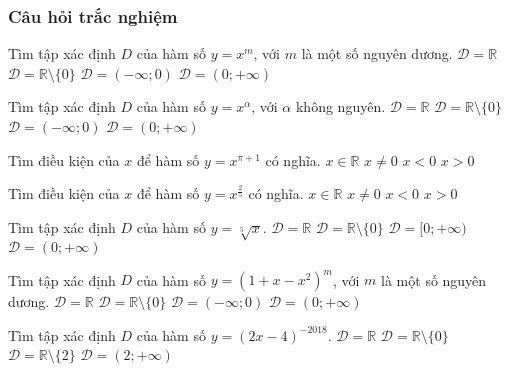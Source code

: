 \subsubsection{Câu hỏi trắc nghiệm}
\begin{ex}%
	Tìm tập xác định $D$ của hàm số $y=x^m$, với $m$ là một số nguyên dương. 
	\choice
	{\True $\mathscr{D}=\mathbb{R}$}
	{$\mathscr{D}=\mathbb{R}\setminus\{0\}$}
	{$\mathscr{D}=(-\infty; 0)$}
	{$\mathscr{D}=(0;+\infty)$}
\end{ex}
\begin{ex}%
	Tìm tập xác định $D$ của hàm số $y=x^{\alpha}$, với $\alpha$ không nguyên. 
	\choice
	{$\mathscr{D}=\mathbb{R}$}
	{$\mathscr{D}=\mathbb{R}\setminus\{0\}$}
	{$\mathscr{D}=(-\infty; 0)$}
	{\True $\mathscr{D}=(0;+\infty)$}
\end{ex}
\begin{ex}%
	Tìm điều kiện của $x$ để hàm số $y=x^{\pi+1}$ có nghĩa. 
	\choice
	{$x\in\mathbb{R}$}
	{$x\neq 0$}
	{$x<0$}
	{\True $x>0$}
\end{ex}
\begin{ex}%
	Tìm điều kiện của $x$ để hàm số $y=x^{\tfrac{2}{5}}$ có nghĩa. 
	\choice
	{$x\in\mathbb{R}$}
	{$x\neq 0$}
	{$x<0$}
	{\True $x>0$}
\end{ex}
\begin{ex}%
	Tìm tập xác định $D$ của hàm số $y=\sqrt[5]{x}$. 
	\choice
	{\True $\mathscr{D}=\mathbb{R}$}
	{$\mathscr{D}=\mathbb{R}\setminus\{0\}$}
	{$\mathscr{D}=[0;+\infty)$}
	{$\mathscr{D}=(0;+\infty)$}
\end{ex}
\begin{ex}%
	Tìm tập xác định $D$ của hàm số $y=(1+x-x^2)^m$, với $m$ là một số nguyên dương. 
	\choice
	{\True $\mathscr{D}=\mathbb{R}$}
	{$\mathscr{D}=\mathbb{R}\setminus\{0\}$}
	{$\mathscr{D}=(-\infty; 0)$}
	{$\mathscr{D}=(0;+\infty)$}
\end{ex}
\begin{ex}%
	Tìm tập xác định $D$ của hàm số $y=(2x-4)^{-2018}$. 
	\choice
	{$\mathscr{D}=\mathbb{R}$}
	{\True $\mathscr{D}=\mathbb{R}\setminus\{0\}$}
	{$\mathscr{D}=\mathbb{R}\setminus\{2\}$}
	{$\mathscr{D}=(2;+\infty)$}
\end{ex}
